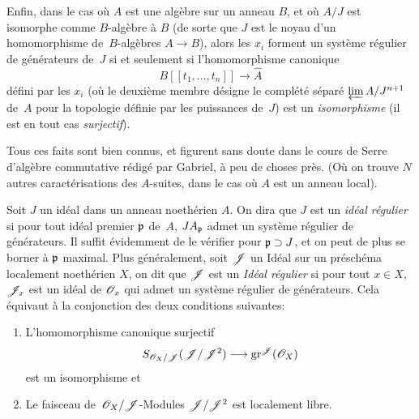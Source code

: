 \begin{remarques}
Enfin, dans le cas o\`u $A$ est une alg\`ebre sur un anneau $B$,
et o\`u $A/J$ est isomorphe comme $B$-alg\`ebre \`a $B$ (de
sorte que $J$ est le noyau d'un homomorphisme de~$B$-alg\`ebres
$A\to B$), alors les $x_i$ forment un syst\`eme r\'egulier de
g\'en\'erateurs de~$J$ si et seulement si l'homomorphisme
canonique
$$
B[[ t_1,\dots,t_n]]\to \hat{A}
$$
d\'efini par les $x_i$ (o\`u le deuxi\`eme membre d\'esigne le
compl\'et\'e s\'epar\'e $\varprojlim A/J^{n+1}$ de~$A$ pour la
topologie d\'efinie par les puissances de~$J$) est un
\emph{isomorphisme} (il est en tout cas \emph{surjectif}).

Tous ces faits sont bien connus, et figurent sans doute dans le cours
de Serre d'alg\`ebre commutative r\'edig\'e par Gabriel, \`a
peu de choses pr\`es. (O\`u on trouve $N$ autres
caract\'erisations des $A$-suites, dans le cas o\`u $A$ est un
anneau local).

Soit $J$ un id\'eal dans un anneau noeth\'erien $A$. On dira que
$J$ est un \emph{idéal régulier}
si pour tout id\'eal premier $\mathfrak p$ de~$A$, $JA_{\mathfrak p}$ admet
un syst\`eme r\'egulier de g\'en\'erateurs. Il suffit
\'evidemment de le v\'erifier pour $\mathfrak p \supset J$, et on peut
de plus se borner \`a $\mathfrak p$ maximal. Plus g\'en\'eralement,
soit $\cal{J}$ un Id\'eal sur un pr\'esch\'ema localement
noeth\'erien $X$, on dit que $\cal{J}$ est un \emph{Idéal
régulier} si pour tout $x\in X$, $\cal{J}_x$ est un id\'eal de
$\cal{O}_x$ qui admet un syst\`eme r\'egulier de
g\'en\'erateurs. Cela \'equivaut \`a la conjonction des deux
conditions suivantes:
\begin{enumerate}
\item[(a)] L'homomorphisme canonique surjectif
$$
S_{\cal{O}_X/\cal{J}}(\cal{J}/\cal{J}^2) \to \gr^{\cal{J}}(\cal{O}_X)
$$
est un isomorphisme et
\item[(b)] Le faisceau de~$\cal{O}_X/\cal{J}$-Modules
$\cal{J}/\cal{J}^2$ est localement libre.
\end{enumerate}


\end{remarques}
